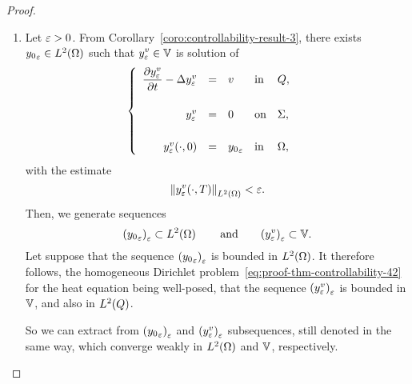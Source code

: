 \begin{proof}%
    \begin{enumerate}
        \item Let $\varepsilon > 0$. From
            Corollary~\ref{coro:controllability-result-3}, there exists
            ${y_{0}}_{\varepsilon}\in L^{2}\!\left({\Omega}\right)$ such that $\displaystyle
            y_{\varepsilon}^{v}\in \mathbb{V}$ is solution of
            \begin{equation}\label{eq:proof-thm-controllability-42}
                \begin{cases}\displaystyle
                    \begin{array}{rclll}
                        \dfrac{\partial{}y_{\varepsilon}^{v}}{\partial{}t} - \Delta y_{\varepsilon}^{v} &
                        = & v & \text{in} & Q,\\
                        \\
                        y_{\varepsilon}^{v} & = & 0 & \text{on} & \Sigma,\\
                        \\
                        y_{\varepsilon}^{v}\!\left({\cdot,0}\right) & = &
                        {y_{0}}_{\varepsilon} & \text{in} & \Omega,
                    \end{array}
                \end{cases}
            \end{equation}
            with the estimate
            \begin{equation}\label{eq:proof-thm-controllability-43}
                {\left\|{y_{\varepsilon}^{v}\!\left({\cdot, T}\right) }\right\|}_{L^{2}\left({\Omega}\right)} < \varepsilon.
            \end{equation}
            Then, we generate sequences
            \begin{equation*}
                {\left({{y_{0}}_{\varepsilon}}\right)}_{\varepsilon}\subset
                L^{2}\!\left({\Omega}\right)\qquad\text{and}\qquad
                {\left({y_{\varepsilon}^{v}}\right)}_{\varepsilon}\subset \mathbb{V}.
            \end{equation*}
            Let suppose that the sequence
            ${\left({{y_{0}}_{\varepsilon}}\right)}_{\varepsilon}$ is bounded in
            $L^{2}\!\left({\Omega}\right)$. It therefore follows, the homogeneous
            Dirichlet problem~\eqref{eq:proof-thm-controllability-42} for
            the heat equation being well-posed, that the sequence
            ${\left({y_{\varepsilon}^{v}}\right)}_{\varepsilon}$ is bounded in $\mathbb{V}$,
            and also in $L^{2}\!\left({Q}\right)$.

            So we can extract from
            ${\left({{y_{0}}_{\varepsilon}}\right)}_{\varepsilon}$ and
            ${\left({y_{\varepsilon}^{v}}\right)}_{\varepsilon}$ subsequences, still
            denoted in the same way, which converge weakly in
            $L^{2}\!\left({\Omega}\right)$ and $\mathbb{V}$, respectively.


\end{enumerate}
\end{proof}
